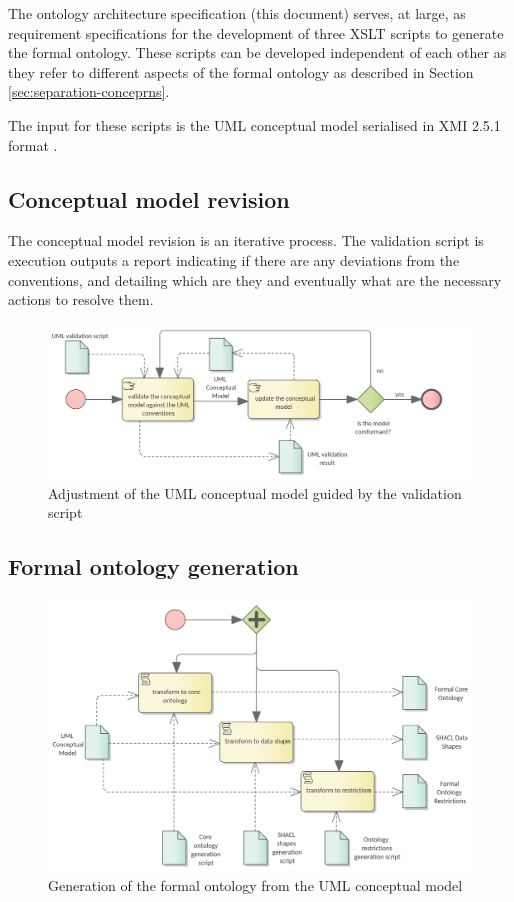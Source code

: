 	The ontology architecture specification (this document) serves, at large, as requirement specifications for the development of three XSLT scripts to generate the formal ontology. These scripts can be developed independent of each other as they refer to different aspects of the formal ontology as described in Section \ref{sec:separation-conceprns}.
	
	The input for these scripts is the UML conceptual model serialised in XMI 2.5.1 format \cite{xmi2.5.1}.
	
	\subsection{Conceptual model revision}
	\label{sec:revision-cm}
	
	The conceptual model revision is an iterative process. The validation script is execution outputs a report indicating if there are any deviations from the conventions, and detailing which are they and eventually what are the necessary actions to resolve them. 
	
	\begin{figure}[!ht]	
		\centering
		\includegraphics[width=.85\textwidth]{../img/conceptualModelRevision.png}
		\caption{Adjustment of the UML conceptual model guided by the validation script}
		\label{fig:revision-cm}
	\end{figure}
	
	\subsection{Formal ontology generation}
	\label{sec:ontology-generation}
	
	\begin{figure}[!ht]		
		\centering
		\includegraphics[width=\textwidth]{../img/formalOntologyGeneration.png}
		\caption{Generation of the formal ontology from the UML conceptual model}
		\label{fig:ontology-generation}
	\end{figure}
	

